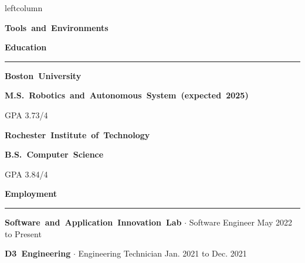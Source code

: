 \documentclass{article}
\newcommand{\rSection}[1] {
  \textcolor{header-blue} {
    \textbf{{\fontsize{0.5cm}{0.45cm}\selectfont \hbox{#1}}} \\
    \rule{0.30\textwidth}{0.1cm}
  }
}
\newcommand{\rSubSection}[1] {
  \textbf{{\fontsize{0.4cm}{0.45cm}\selectfont \hbox{#1}}}
}
\newcommand{\rSubSubSection}[1] {
  \textbf{{\fontsize{0.35cm}{0.45cm}\selectfont \hbox{#1}}}
}
\newcommand\level[2]{%
  \tikz{%
    \ifx#20
    \else
      \foreach \i in {1,...,#2} {
        \filldraw[black!20] (\i ex,0) circle (0.4ex);
      };
    \fi
    \ifx#10
    \else
      \foreach \i in {1,...,#1} {
        \filldraw[black] (\i ex,0) circle (0.4ex);
      };
    \fi
  }
}
\begin{document}
\begin{dynamiccontents*}{leftcolumn}
    \rSubSection{Tools and Environments} \par \bigskip
    \vspace{-10pt}

\end{dynamiccontents*}

\rSection{Education} \par
\rSubSubSection{Boston University} \par
\rSubSubSection{M.S. Robotics and Autonomous System (expected 2025)} \par
GPA 3.73/4 \par

\rSubSubSection{Rochester Institute of Technology} \par
\rSubSubSection{B.S. Computer Science} \par
GPA 3.84/4 \par

\rSection{Employment} \par

\rSubSubSection{Software and Application Innovation Lab} $ \cdot $ Software Engineer \hfill May 2022 to Present \par
\vspace{-10pt}
    
\vspace{-10pt}

\rSubSubSection{D3 Engineering} $ \cdot $ Engineering Technician \hfill Jan. 2021 to Dec. 2021 \par
\vspace{-10pt}
    
\vspace{-10pt}
\end{document}
